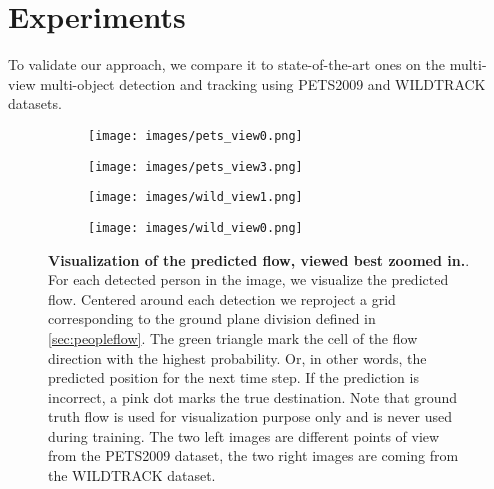 \documentclass[10pt,twocolumn,letterpaper]{article}
\begin{document}
\section{Experiments}\label{sec:expe}
 

To validate our approach, we compare it to state-of-the-art ones on the multi-view multi-object detection and tracking using PETS2009 and WILDTRACK datasets. 






\begin{figure*}[h]

    \centering
    \begin{subfigure}[c]{0.235\textwidth}
        \centering
        \texttt{[image: images/pets\_view0.png]}
    \end{subfigure}
    \hfill
    \begin{subfigure}[c]{0.235\textwidth}  
        \centering 
        \texttt{[image: images/pets\_view3.png]}
    \end{subfigure}
    \hfill
    \begin{subfigure}[c]{0.235\textwidth}   
        \centering 
        \texttt{[image: images/wild\_view1.png]}
    \end{subfigure}
    \hfill
    \begin{subfigure}[c]{0.235\textwidth}   
        \centering 
        \texttt{[image: images/wild\_view0.png]}
    \end{subfigure}

\caption{\textbf{Visualization of the predicted flow, viewed best zoomed in.}. For each detected person in the image, we visualize the predicted flow.
Centered around each detection we reproject a  grid corresponding to the ground plane division defined in \cref{sec:peopleflow}.
The green triangle mark the cell of the flow direction with the highest probability. Or, in other words, the predicted position for the next time step.
If the prediction is incorrect, a pink dot marks the true destination. Note that ground truth flow is used for visualization purpose only and is never used during training.
The two left images are different points of view from the PETS2009 dataset, the two right images are coming from the WILDTRACK dataset.
}
\label{fig:visu_flow}

\end{figure*}
\end{document}

